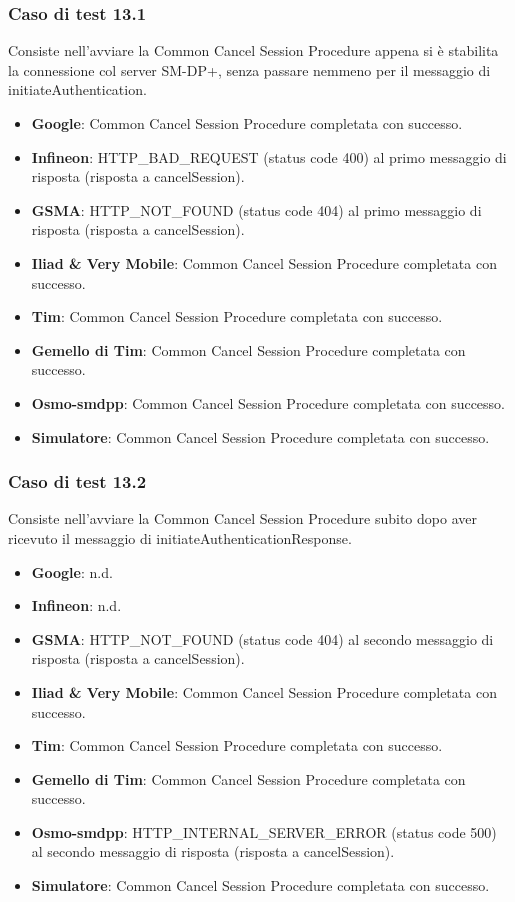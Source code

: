 \documentclass[10pt, oneside]{book}
\begin{document}
\subsubsection{Caso di test 13.1}
Consiste nell'avviare la Common Cancel Session Procedure appena si è stabilita la connessione col server SM-DP+, senza passare nemmeno per il messaggio di initiateAuthentication.
\begin{itemize}
\item \textbf{Google}: Common Cancel Session Procedure completata con successo.
\item \textbf{Infineon}: HTTP\_BAD\_REQUEST (status code 400) al primo messaggio di risposta (risposta a cancelSession).
\item \textbf{GSMA}: HTTP\_NOT\_FOUND (status code 404) al primo messaggio di risposta (risposta a cancelSession).
\item \textbf{Iliad \& Very Mobile}: Common Cancel Session Procedure completata con successo.
\item \textbf{Tim}: Common Cancel Session Procedure completata con successo.
\item \textbf{Gemello di Tim}: Common Cancel Session Procedure completata con successo.
\item \textbf{Osmo-smdpp}: Common Cancel Session Procedure completata con successo.
\item \textbf{Simulatore}: Common Cancel Session Procedure completata con successo.
\end{itemize}

\subsubsection{Caso di test 13.2}
Consiste nell'avviare la Common Cancel Session Procedure subito dopo aver ricevuto il messaggio di initiateAuthenticationResponse.
\begin{itemize}
\item \textbf{Google}: n.d.
\item \textbf{Infineon}: n.d.
\item \textbf{GSMA}: HTTP\_NOT\_FOUND (status code 404) al secondo messaggio di risposta (risposta a cancelSession).
\item \textbf{Iliad \& Very Mobile}: Common Cancel Session Procedure completata con successo.
\item \textbf{Tim}: Common Cancel Session Procedure completata con successo.
\item \textbf{Gemello di Tim}: Common Cancel Session Procedure completata con successo.
\item \textbf{Osmo-smdpp}: HTTP\_INTERNAL\_SERVER\_ERROR (status code 500) al secondo messaggio di risposta (risposta a cancelSession).
\item \textbf{Simulatore}: Common Cancel Session Procedure completata con successo.
\end{itemize}
\end{document}
